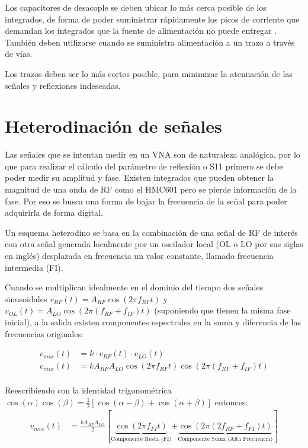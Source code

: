 Los capacitores de desacople se deben ubicar lo más cerca posible de los integrados, de forma de poder suministrar rápidamente los picos de corriente que demandan los integrados que la fuente de alimentación no puede entregar \cite{altium_caps_desacople}. También deben utilizarse cuando se suministra alimentación a un trazo a través de vías.

Los trazos deben ser lo más cortos posible, para minimizar la atenuación de las señales y reflexiones indeseadas.


\section{Heterodinación de señales}
Las señales que se intentan medir en un VNA son de naturaleza analógica, por lo que para realizar el cálculo del parámetro de reflexión o S11 primero se debe poder medir su amplitud y fase. Existen integrados que pueden obtener la magnitud de una onda de RF como el HMC601 \cite{AnalogDevices_HMC601} pero se pierde información de la fase. Por eso se busca una forma de bajar la frecuencia de la señal para poder adquirirla de forma digital.

Un esquema heterodino se basa en la combinación de una señal de RF de interés con otra señal generada localmente por un oscilador local (OL o LO por sus siglas en inglés) desplazada en frecuencia un valor constante, llamado frecuencia intermedia (FI). 

Cuando se multiplican idealmente en el dominio del tiempo dos señales sinusoidales $v_{RF}(t)= A_{RF}\cos(2\pi f_{RF}t)$ y $v_{OL}(t)= A_{LO}\cos(2\pi(f_{RF}+f_{IF})t)$ (suponiendo que tienen la misma fase inicial), a la salida existen componentes espectrales en la suma y diferencia de las frecuencias originales:

\begin{subequations}
\begin{align}
v_{mix}(t) &= k \cdot v_{RF}(t) \cdot v_{LO}(t) \\
v_{mix}(t) &= k A_{RF} A_{LO}\cos(2\pi f_{RF}t)\cos(2\pi (f_{RF}+f_{IF})t) \\
\end{align}
\end{subequations}

Reescribiendo con la identidad trigonométrica $\cos(\alpha)\cos(\beta) = \frac{1}{2}\left[\cos(\alpha-\beta)+\cos(\alpha+\beta)\right]$ entonces:
\begin{subequations}
\begin{align}
v_{mix}(t) &= \frac{k A_{RF} A_{LO}}{2}\left[\underbrace{\cos\left(
2\pi f_{FI}t\right)}_{\text{Componente Resta (FI)}}
\right.\left.+\underbrace{ \cos\left(2\pi(2 f_{RF}+f_{FI})t\right)
}_{\text{Componente Suma (Alta Frecuencia)}} \right]
\end{align}
\end{subequations}

